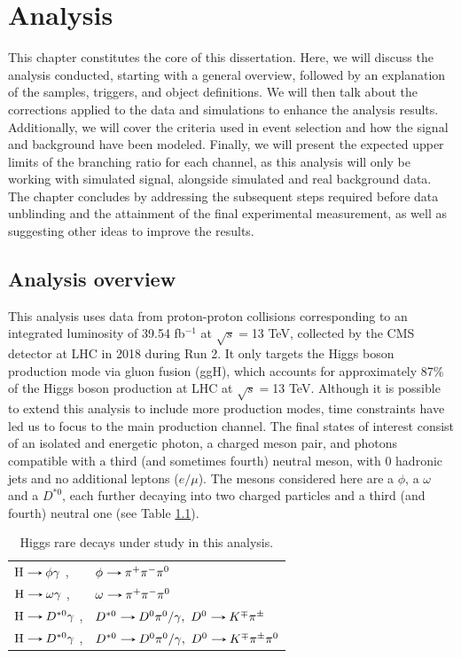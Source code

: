 \chapter[Analysis]{Analysis}\label{chap:analysis}

This chapter constitutes the core of this dissertation. Here, we will discuss the analysis conducted, starting with a general overview, followed by an explanation of the samples, triggers, and object definitions. We will then talk about the corrections applied to the data and simulations to enhance the analysis results. Additionally, we will cover the criteria used in event selection and how the signal and background have been modeled. Finally, we will present the expected upper limits of the branching ratio for each channel, as this analysis will only be working with simulated signal, alongside simulated and real background data. The chapter concludes by addressing the subsequent steps required before data unblinding and the attainment of the final experimental measurement, as well as suggesting other ideas to improve the results.

\section{Analysis overview}\label{sec:analysis_overview}

This analysis uses data from proton-proton collisions corresponding to an integrated luminosity of 39.54 fb$^{-1}$ at $\sqrt{s}=$13 TeV, collected by the CMS detector at LHC in 2018 during Run 2. It only targets the Higgs boson production mode via gluon fusion (ggH), which accounts for approximately 87\% of the Higgs boson production at LHC at $\sqrt{s}=$13 TeV. Although it is possible to extend this analysis to include more production modes, time constraints have led us to focus to the main production channel. The final states of interest consist of an isolated and energetic photon, a charged meson pair, and photons compatible with a third (and sometimes fourth) neutral meson, with 0 hadronic jets and no additional leptons ($e/\mu$). The mesons considered here are a $\phi$, a $\omega$ and a $D^{*0}$, each further decaying into two charged particles and a third (and fourth) neutral one (see Table \ref{tab:Higgs_rare_decays_three}).

\begin{table}[ht]
    \centering
    \begin{tabular}{ll}
        $\text{H}\decaysto \phi\gamma$ ,& $\phi\decaysto \pi^+\pi^-\pi^0$ \\
        $\text{H}\decaysto \omega\gamma$ ,& $\omega\decaysto \pi^+\pi^-\pi^0$\\
        $\text{H}\decaysto D^{*0}\gamma$ ,& $D^{*0}\decaysto D^{0}\pi^{0}/\gamma,\ D^{0}\decaysto K^{\mp}\pi^{\pm}$\\
        $\text{H}\decaysto D^{*0}\gamma$ ,& $D^{*0}\decaysto D^{0}\pi^{0}/\gamma,\ D^{0}\decaysto K^{\mp}\pi^{\pm}\pi^{0}$
    \end{tabular}
    \caption{Higgs rare decays under study in this analysis.}
    \label{tab:Higgs_rare_decays_three}
\end{table}

